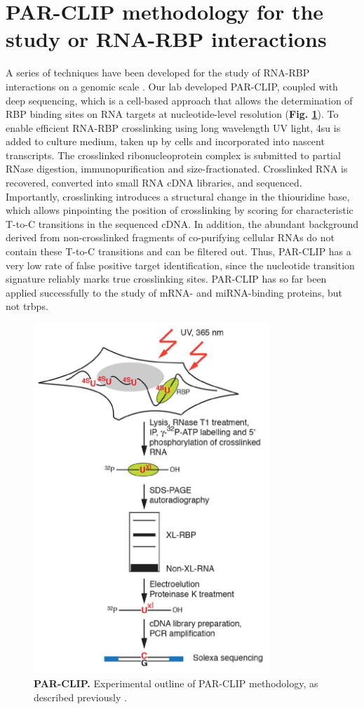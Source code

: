 \documentclass[12pt]{rockefeller}
\begin{document}
\section{PAR-CLIP methodology for the study or RNA-RBP interactions}
A series of techniques have been developed for the study of RNA-RBP interactions on a genomic scale \cite{Konig:2011jv}. Our lab developed PAR-CLIP, coupled with deep sequencing, which is a cell-based approach that allows the determination of RBP binding sites on RNA targets at nucleotide-level resolution (\textbf{Fig. \ref{parclip}}). To enable efficient RNA-RBP crosslinking using long wavelength UV light, \gls{4su} is added to culture medium, taken up by cells and incorporated into nascent transcripts. The crosslinked ribonucleoprotein complex is submitted to partial RNase digestion, immunopurification and size-fractionated. Crosslinked RNA is recovered, converted into small RNA cDNA libraries, and sequenced. Importantly, crosslinking introduces a structural change in the thiouridine base, which allows pinpointing the position of crosslinking by scoring for characteristic T-to-C transitions in the sequenced cDNA. In addition, the abundant background derived from non-crosslinked fragments of co-purifying cellular RNAs do not contain these T-to-C transitions and can be filtered out. Thus, PAR-CLIP has a very low rate of false positive target identification, since the nucleotide transition signature reliably marks true crosslinking sites. PAR-CLIP has so far been applied successfully to the study of mRNA- and miRNA-binding proteins, but not \glspl{trbp}.

\begin{figure}[!ht]%
\centering
\includegraphics[width=3.5in]{parclip.png}%
\caption[PAR-CLIP]
{\textbf{PAR-CLIP.}
Experimental outline of PAR-CLIP methodology, as described previously \cite{Hafner:2010kr}.}
\centering
\label{parclip}%
\end{figure}
\end{document}
